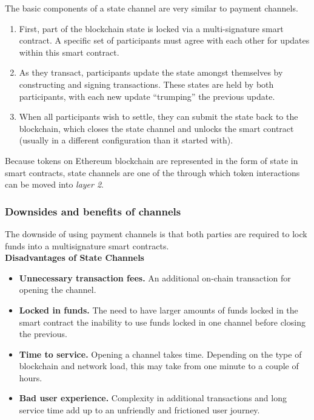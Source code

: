 \documentclass[a4paper,12pt]{article}
\begin{document}
The basic components of a state channel are very similar to payment channels.
\begin{enumerate}
    \item First, part of the blockchain state is locked via a multi-signature 
    smart contract. A specific set of participants must agree with each other 
    for updates within this smart contract.
    \item As they transact, participants update the state amongst themselves 
    by constructing and signing transactions. These states are held by both 
    participants, with each new update “trumping” the previous update.
    \item When all participants wish to settle, they can submit the state back
    to the blockchain, which closes the state channel and unlocks the smart 
    contract (usually in a different configuration than it started with).
\end{enumerate}

Because tokens on Ethereum blockchain are represented in the form of state in 
smart contracts, state channels are one of the through which token interactions 
can be moved into \textit{layer 2}. 

\subsubsection{Downsides and benefits of channels}

The downside of using payment channels is that both parties are required to lock 
funds into a multisignature smart contracts.\\

\textbf{\large {Disadvantages of State Channels}}
\begin{itemize}
    \item \textbf{Unnecessary transaction fees.} An additional on-chain transaction
    for opening the channel.
    \item \textbf{Locked in funds.} The need to have larger amounts of funds locked
    in the smart contract the inability to use funds locked in one channel before 
    closing the previous.
    \item \textbf{Time to service.} Opening a channel takes time. Depending on the 
    type of blockchain and network load, this may take from one minute to a couple 
    of hours.
    \item \textbf{Bad user experience.} Complexity in additional transactions and 
    long service time add up to an unfriendly and frictioned user journey.
\end{itemize}
\end{document}
